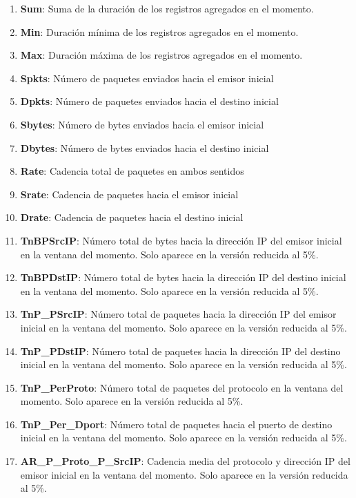 \begin{enumerate}
    \item \textbf{Sum}: Suma de la duración de los registros agregados en el momento.
    \item \textbf{Min}: Duración mínima de los registros agregados en el momento.
    \item \textbf{Max}: Duración máxima de los registros agregados en el momento.
    \item \textbf{Spkts}: Número de paquetes enviados hacia el emisor inicial
    \item \textbf{Dpkts}: Número de paquetes enviados hacia el destino inicial
    \item \textbf{Sbytes}: Número de bytes enviados hacia el emisor inicial
    \item \textbf{Dbytes}: Número de bytes enviados hacia el destino inicial
    \item \textbf{Rate}: Cadencia total de paquetes en ambos sentidos
    \item \textbf{Srate}: Cadencia de paquetes hacia el emisor inicial
    \item \textbf{Drate}: Cadencia de paquetes hacia el destino inicial
    \item \textbf{TnBPSrcIP}: Número total de bytes hacia la dirección IP del emisor inicial en la ventana del momento. Solo aparece en la versión reducida al 5\%.
    \item \textbf{TnBPDstIP}: Número total de bytes hacia la dirección IP del destino inicial en la ventana del momento. Solo aparece en la versión reducida al 5\%.
    \item \textbf{TnP\_PSrcIP}: Número total de paquetes hacia la dirección IP del emisor inicial en la ventana del momento. Solo aparece en la versión reducida al 5\%.
    \item \textbf{TnP\_PDstIP}: Número total de paquetes hacia la dirección IP del destino inicial en la ventana del momento. Solo aparece en la versión reducida al 5\%.
    \item \textbf{TnP\_PerProto}: Número total de paquetes del protocolo en la ventana del momento. Solo aparece en la versión reducida al 5\%.
    \item \textbf{TnP\_Per\_Dport}: Número total de paquetes hacia el puerto de destino inicial en la ventana del momento. Solo aparece en la versión reducida al 5\%.
    \item \textbf{AR\_P\_Proto\_P\_SrcIP}: Cadencia media del protocolo y dirección IP del emisor inicial en la ventana del momento. Solo aparece en la versión reducida al 5\%.

\end{enumerate}
